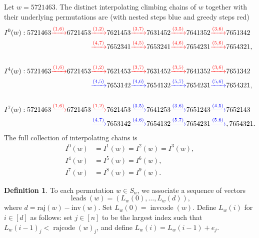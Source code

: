\documentclass[11pt]{amsart}
\theoremstyle{definition}
\newtheorem{definition}[theorem]{Definition}
\newenvironment{example}
{\pushQED{\qed}\renewcommand{\qedsymbol}{$\diamondsuit$}\examplex}
{\popQED\endexamplex}
\theoremstyle{named}
\DeclareMathOperator{\cc}{\mathrm{invcode}} %
\DeclareMathOperator{\rr}{\mathrm{rajcode}} %
\newcommand{\absrajcode}[1]{\mathrm{raj}(#1)}
\newcommand{\absinvcode}[1]{\mathrm{inv}(#1)}
\DeclareMathOperator{\leads}{\mathrm{leads}}
\begin{document}
	\begin{example}
		\label{exp:5721463intchains}
		Let $w=5721463$. The distinct interpolating climbing chains of $w$ together with their underlying permutations are (with nested steps blue and greedy steps red)
		\begin{align*}
		I^0(w): 5721463 \textcolor{red}{\xrightarrow{(1,6)}} 6721453
		\textcolor{red}{\xrightarrow{(1,2)}} 7621453
		&\textcolor{red}{\xrightarrow{(3,7)}} 7631452
		\textcolor{red}{\xrightarrow{(3,5)}} 7641352
		\textcolor{red}{\xrightarrow{(3,6)}} 7651342\\ 
		\textcolor{red}{\xrightarrow{(4,7)}} 7652341
		&\textcolor{red}{\xrightarrow{(4,5)}} 7653241
		\textcolor{red}{\xrightarrow{(4,6)}} 7654231
		\textcolor{red}{\xrightarrow{(5,6)}} 7654321,\\
		\phantom{a}\\
		I^4(w): 5721463 \textcolor{red}{\xrightarrow{(1,6)}} 6721453
		\textcolor{red}{\xrightarrow{(1,2)}} 7621453
		&\textcolor{red}{\xrightarrow{(3,7)}} 7631452
		\textcolor{red}{\xrightarrow{(3,5)}} 7641352
		\textcolor{red}{\xrightarrow{(3,6)}} 7651342\\ 
		\textcolor{blue}{\xrightarrow{(4,5)}} 7653142
		&\textcolor{blue}{\xrightarrow{(4,6)}} 7654132
		\textcolor{blue}{\xrightarrow{(5,7)}} 7654231
		\textcolor{blue}{\xrightarrow{(5,6)}} 7654321,\\
		\phantom{a}\\
		I^7(w): 5721463 \textcolor{red}{\xrightarrow{(1,6)}} 6721453
		\textcolor{red}{\xrightarrow{(1,2)}} 7621453
		&\textcolor{blue}{\xrightarrow{(3,5)}} 7641253
		\textcolor{blue}{\xrightarrow{(3,6)}} 7651243
		\textcolor{blue}{\xrightarrow{(4,5)}} 7652143\\ 
		\textcolor{blue}{\xrightarrow{(4,7)}} 7653142
		&\textcolor{blue}{\xrightarrow{(4,6)}} 7654132
		\textcolor{blue}{\xrightarrow{(5,7)}} 7654231
		\textcolor{blue}{\xrightarrow{(5,6)}} ,7654321.
		\end{align*}
		The full collection of interpolating chains is 
		\begin{align*}
			I^0(w)&=I^1(w)=I^2(w)=I^3(w),\\
			I^4(w)&=I^5(w)=I^6(w),\\
			I^7(w)&=I^8(w)=I^9(w).
		\end{align*}
	\end{example}
	
	\begin{definition}
		To each permutation $w\in S_n$, we associate a sequence of vectors \[\leads(w)=(L_w(0),\ldots,L_w(d)),\] where $d=\absrajcode{w}-\absinvcode{w}$. Set $L_w(0)=\cc(w)$. Define $L_w(i)$ for $i\in [d]$ as follows: set $j\in [n]$ to be the largest index such that $L_w(i-1)_j<\rr(w)_j$, and define $L_w(i) = L_w(i-1) + e_j$.
	\end{definition}
	
\end{document}
